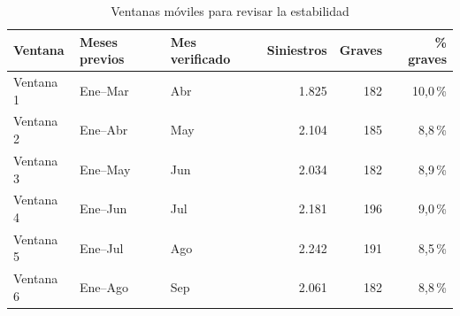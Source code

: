 \begin{table}[htbp]
\centering
\small
\caption{Ventanas móviles para revisar la estabilidad}
\label{tab:a7}
\begin{tabular}{lllrrr}
\toprule
Ventana & Meses previos & Mes verificado & Siniestros & Graves & \% graves \\
\midrule
Ventana 1 & Ene--Mar & Abr & 1.825 & 182 & 10,0\,\% \\
Ventana 2 & Ene--Abr & May & 2.104 & 185 & 8,8\,\% \\
Ventana 3 & Ene--May & Jun & 2.034 & 182 & 8,9\,\% \\
Ventana 4 & Ene--Jun & Jul & 2.181 & 196 & 9,0\,\% \\
Ventana 5 & Ene--Jul & Ago & 2.242 & 191 & 8,5\,\% \\
Ventana 6 & Ene--Ago & Sep & 2.061 & 182 & 8,8\,\% \\
\bottomrule
\end{tabular}
\par\vspace{2pt}{\footnotesize Cada ventana contrasta un mes con todos los meses anteriores y conserva el orden temporal. Con estas ventanas se comprueba el criterio CA-07. Cálculo propio (Anexo B).}
\end{table}
